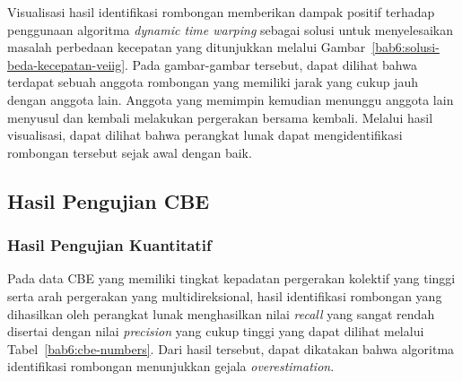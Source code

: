 Visualisasi hasil identifikasi rombongan memberikan dampak positif terhadap penggunaan algoritma \textit{dynamic time warping} sebagai solusi untuk menyelesaikan masalah perbedaan kecepatan yang ditunjukkan melalui Gambar~\ref{bab6:solusi-beda-kecepatan-veiig}. Pada gambar-gambar tersebut, dapat dilihat bahwa terdapat sebuah anggota rombongan yang memiliki jarak yang cukup jauh dengan anggota lain. Anggota yang memimpin kemudian menunggu anggota lain menyusul dan kembali melakukan pergerakan bersama kembali. Melalui hasil visualisasi, dapat dilihat bahwa perangkat lunak dapat mengidentifikasi rombongan tersebut sejak awal dengan baik.

\subsection{Hasil Pengujian CBE}
\label{subsec:cbe-result}

\subsubsection{Hasil Pengujian Kuantitatif}
\label{subsubsec:cbe-quantitative}

Pada data CBE yang memiliki tingkat kepadatan pergerakan kolektif yang tinggi serta arah pergerakan yang multidireksional, hasil identifikasi rombongan yang dihasilkan oleh perangkat lunak menghasilkan nilai \textit{recall} yang sangat rendah disertai dengan nilai \textit{precision} yang cukup tinggi yang dapat dilihat melalui Tabel~\ref{bab6:cbe-numbers}. Dari hasil tersebut, dapat dikatakan bahwa algoritma identifikasi rombongan menunjukkan gejala \textit{overestimation}.

